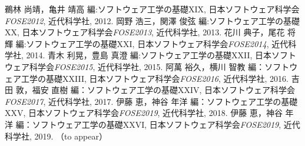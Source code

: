 \documentclass{fose2019}           %
\begin{document}
%


\begin{thebibliography}{9}
 鵜林 尚靖，亀井 靖高 編:ソフトウェア工学の基礎XIX,
         日本ソフトウェア科学会{\em FOSE2012}, 近代科学社, 2012.
 岡野 浩三，関澤 俊弦 編:ソフトウェア工学の基礎XX,
         日本ソフトウェア科学会{\em FOSE2013}, 近代科学社, 2013.
 花川 典子，尾花 将輝 編:ソフトウェア工学の基礎XXI,
         日本ソフトウェア科学会{\em FOSE2014}, 近代科学社, 2014.
  青木 利晃，豊島 真澄 編:ソフトウェア工学の基礎XXII,
         日本ソフトウェア科学会{\em FOSE2015}, 近代科学社, 2015.
  阿萬 裕久，横川 智教 編：ソフトウェア工学の基礎XXIII,
	 日本ソフトウェア科学会{\em FOSE2016}, 近代科学社, 2016.
 吉田 敦，福安 直樹 編：ソフトウェア工学の基礎XXIV,
	 日本ソフトウェア科学会{\em FOSE2017}, 近代科学社, 2017.
 伊藤 恵，神谷 年洋 編：ソフトウェア工学の基礎XXV,
	 日本ソフトウェア科学会{\em FOSE2019}, 近代科学社, 2018. 
 伊藤 恵，神谷 年洋 編：ソフトウェア工学の基礎XXVI,
	 日本ソフトウェア科学会{\em FOSE2019}, 近代科学社, 2019. （to appear）
\end{thebibliography}
\end{document}
